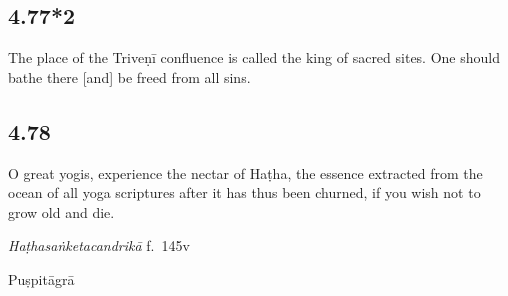 \begin{ekdosis}
\subsection*{4.77*2}
\begin{translation}[hp04_077_2]
The place of the Triveṇī confluence is called the king of sacred sites. One should bathe there [and] be freed from all sins.
\end{translation}




\subsection*{4.78}
\begin{translation}[hp04_078]
O great yogis, experience the nectar of Haṭha, the essence extracted from the ocean of all yoga scriptures after it has thus been churned, if you wish not to grow old and die.
\end{translation} %


\begin{testimonia}[hp04_078]
\emph{Haṭhasaṅketacandrikā} f.~145v
\begin{versinnote}
\end{versinnote}
\end{testimonia}

\begin{philcomm}[hp04_078]
\end{philcomm}

\begin{metre}[hp04_078]
Puṣpitāgrā
\end{metre}


\end{ekdosis}
